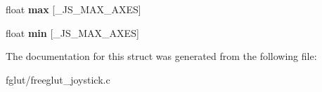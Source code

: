 \begin{DoxyCompactItemize}
\item 
float {\bfseries max} \mbox{[}\+\_\+\+J\+S\+\_\+\+M\+A\+X\+\_\+\+A\+X\+ES\mbox{]}\hypertarget{structtag_s_f_g___joystick_a89eb375da07d3594d3b69b0791edf4d6}{}\label{structtag_s_f_g___joystick_a89eb375da07d3594d3b69b0791edf4d6}

\item 
float {\bfseries min} \mbox{[}\+\_\+\+J\+S\+\_\+\+M\+A\+X\+\_\+\+A\+X\+ES\mbox{]}\hypertarget{structtag_s_f_g___joystick_ab46900b79e3ec16716d99ecfeca10a1f}{}\label{structtag_s_f_g___joystick_ab46900b79e3ec16716d99ecfeca10a1f}

\end{DoxyCompactItemize}


The documentation for this struct was generated from the following file\+:\begin{DoxyCompactItemize}
\item 
fglut/freeglut\+\_\+joystick.\+c\end{DoxyCompactItemize}
